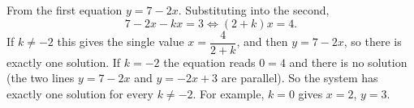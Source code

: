 From the first equation $y=7-2x$. Substituting into the second,
\[
7-2x-kx=3\iff(2+k)x=4 .
\]
If $k\ne-2$ this gives the single value $x=\dfrac{4}{2+k}$, and then $y=7-2x$, so there is exactly one solution. If $k=-2$ the equation reads $0=4$ and there is no solution (the two lines $y=7-2x$ and $y=-2x+3$ are parallel). So the system has exactly one solution for $\boxed{\text{every }k\ne-2}$. For example, $k=0$ gives $x=2$, $y=3$.
